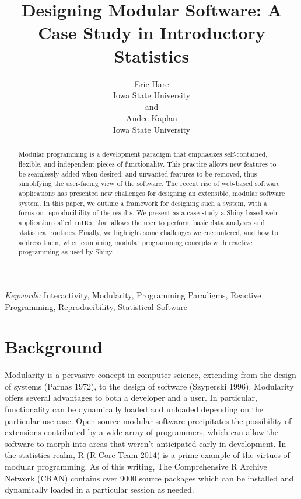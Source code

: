 \documentclass[12pt,]{article}
\title{\bf Designing Modular Software: A Case Study in Introductory Statistics}
\author{Eric Hare \\ Iowa State University \\ \texttt{}  and \\ Andee Kaplan \\ Iowa State University \\ \texttt{} }
\date{}
\begin{document}
\def\spacingset#1{\renewcommand{\baselinestretch}%
{#1}\small\normalsize} \spacingset{1}


\maketitle


\begin{abstract}
Modular programming is a development paradigm that emphasizes
self-contained, flexible, and independent pieces of functionality. This
practice allows new features to be seamlessly added when desired, and
unwanted features to be removed, thus simplifying the user-facing view
of the software. The recent rise of web-based software applications has
presented new challenges for designing an extensible, modular software
system. In this paper, we outline a framework for designing such a
system, with a focus on reproducibility of the results. We present as a
case study a Shiny-based web application called \texttt{intRo}, that
allows the user to perform basic data analyses and statistical routines.
Finally, we highlight some challenges we encountered, and how to address
them, when combining modular programming concepts with reactive
programming as used by Shiny.
\end{abstract}

\noindent%
{\it Keywords:}  Interactivity, Modularity, Programming Paradigms, Reactive Programming,
Reproducibility, Statistical Software
\vfill

\newpage
\spacingset{1.45} %


\section{Background}\label{background}

Modularity is a pervasive concept in computer science, extending from
the design of systems (Parnas 1972), to the design of software
(Szyperski 1996). Modularity offers several advantages to both a
developer and a user. In particular, functionality can be dynamically
loaded and unloaded depending on the particular use case. Open source
modular software precipitates the possibility of extensions contributed
by a wide array of programmers, which can allow the software to morph
into areas that weren't anticipated early in development. In the
statistics realm, R (R Core Team 2014) is a prime example of the virtues
of modular programming. As of this writing, The Comprehensive R Archive
Network (CRAN) contains over 9000 source packages which can be installed
and dynamically loaded in a particular session as needed.
\end{document}
